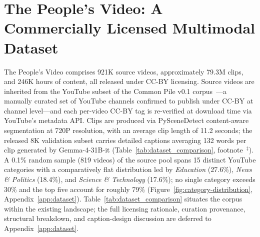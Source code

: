 \documentclass{article}
\begin{document}
\section{The People's Video: A Commercially Licensed Multimodal Dataset}
\label{sec:dataset}

The People's Video comprises 921K source videos, approximately 79.3M clips, and 246K hours of content, all released under CC-BY licensing. Source videos are inherited from the YouTube subset of the Common Pile v0.1 corpus~\cite{kandpal2025commonpile, commonpile_youtube_hf}---a manually curated set of YouTube channels confirmed to publish under CC-BY at channel level---and each per-video CC-BY tag is re-verified at download time via YouTube's metadata API. Clips are produced via PySceneDetect content-aware segmentation at 720P resolution, with an average clip length of 11.2 seconds; the released 8K validation subset carries detailed captions averaging 132 words per clip generated by Gemma-4-31B-it (Table~\ref{tab:dataset_comparison}, footnote~$^{\ddagger}$). A 0.1\% random sample (819 videos) of the source pool spans 15 distinct YouTube categories with a comparatively flat distribution led by \textit{Education} (27.6\%), \textit{News \& Politics} (18.4\%), and \textit{Science \& Technology} (17.6\%); no single category exceeds 30\% and the top five account for roughly 79\% (Figure~\ref{fig:category-distribution}, Appendix~\ref{app:dataset}). Table~\ref{tab:dataset_comparison} situates the corpus within the existing landscape; the full licensing rationale, curation provenance, structural breakdown, and caption-design discussion are deferred to Appendix~\ref{app:dataset}.
\end{document}
